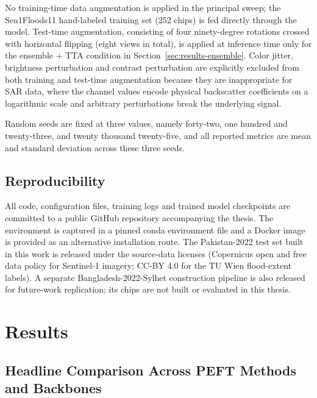 \documentclass[11pt,a4paper,oneside]{report}
\begin{document}
No training-time data augmentation is applied in the principal sweep; the Sen1Floods11 hand-labeled training set (252 chips) is fed directly through the model. Test-time augmentation, consisting of four ninety-degree rotations crossed with horizontal flipping (eight views in total), is applied at inference time only for the ensemble + TTA condition in Section~\ref{sec:results-ensemble}. Color jitter, brightness perturbation and contrast perturbation are explicitly excluded from both training and test-time augmentation because they are inappropriate for SAR data, where the channel values encode physical backscatter coefficients on a logarithmic scale and arbitrary perturbations break the underlying signal.

Random seeds are fixed at three values, namely forty-two, one hundred and twenty-three, and twenty thousand twenty-five, and all reported metrics are mean and standard deviation across these three seeds.

\section{Reproducibility}

All code, configuration files, training logs and trained model checkpoints are committed to a public GitHub repository accompanying the thesis. The environment is captured in a pinned conda environment file and a Docker image is provided as an alternative installation route. The Pakistan-2022 test set built in this work is released under the source-data licenses (Copernicus open and free data policy for Sentinel-1 imagery; CC-BY 4.0 for the TU Wien flood-extent labels). A separate Bangladesh-2022-Sylhet construction pipeline is also released for future-work replication; its chips are not built or evaluated in this thesis.

\chapter{Results}
\label{chap:results}

\section{Headline Comparison Across PEFT Methods and Backbones}
\end{document}

